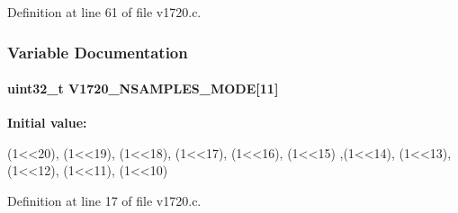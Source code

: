 Definition at line 61 of file v1720.c.

\subsubsection{Variable Documentation}
\paragraph[{V1720\_\-NSAMPLES\_\-MODE}]{\setlength{\rightskip}{0pt plus 5cm}uint32\_\-t {\bf V1720\_\-NSAMPLES\_\-MODE}\mbox{[}11\mbox{]}}\hfill\label{v1720_8c_a9585ae4c07e118efaed53e2a5e4ae703}
{\bfseries Initial value:}
\begin{DoxyCode}
 { (1<<20), (1<<19), (1<<18), (1<<17), (1<<16), (1<<15)
                               ,(1<<14), (1<<13), (1<<12), (1<<11), (1<<10)}
\end{DoxyCode}


Definition at line 17 of file v1720.c.